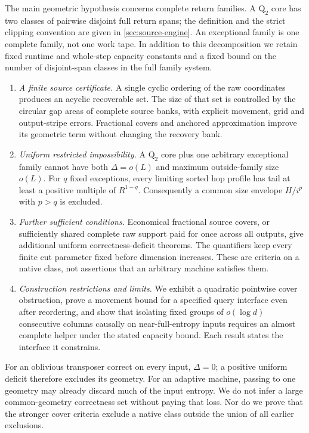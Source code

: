 The main geometric hypothesis concerns complete return families. A
$\mathrm{Q}_2$ core has two classes of pairwise disjoint full return spans;
the definition and the strict clipping convention are given in
\cref{sec:source-engine}. An exceptional family is one complete family,
not one work tape. In addition to this decomposition we retain fixed
runtime and whole-step capacity constants and a fixed bound on the number
of disjoint-span classes in the full family system.

\begin{enumerate}
\item \emph{A finite source certificate.} A single cyclic ordering of the raw
coordinates produces an acyclic recoverable set. The size of that set is
controlled by the circular gap areas of complete source banks, with explicit
movement, grid and output-stripe errors. Fractional covers and anchored
approximation improve its geometric term without changing the recovery bank.
\item \emph{Uniform restricted impossibility.} A $\mathrm{Q}_2$ core plus one
arbitrary exceptional family cannot have both $\Delta=o(L)$ and maximum
outside-family size $o(L)$. For $q$ fixed exceptions, every limiting sorted
hop profile has tail at least a positive multiple of $R^{1-q}$.
Consequently a common size envelope $H/i^p$ with $p>q$ is excluded.
\item \emph{Further sufficient conditions.} Economical fractional source
covers, or sufficiently shared complete raw support paid for once across
all outputs, give additional uniform correctness-deficit theorems.
The quantifiers keep every finite cut parameter fixed before dimension
increases. These are criteria on a native class, not assertions that an
arbitrary machine satisfies them.
\item \emph{Construction restrictions and limits.} We exhibit a quadratic
pointwise cover obstruction, prove a movement bound for a specified query
interface even after reordering, and show that isolating fixed groups of
$o(\log d)$ consecutive columns causally on near-full-entropy inputs
requires an almost complete helper under the stated capacity bound.
Each result states the interface it constrains.
\end{enumerate}

For an oblivious transposer correct on every input, $\Delta=0$; a positive
uniform deficit therefore excludes its geometry. For an adaptive machine,
passing to one geometry may already discard much of the input entropy.
We do not infer a large common-geometry correctness set without paying
that loss. Nor do we prove that the stronger cover criteria exclude a
native class outside the union of all earlier exclusions.

